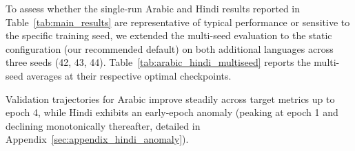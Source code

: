 \documentclass[11pt]{article}
\begin{document}
To assess whether the single-run Arabic and Hindi results reported in Table~\ref{tab:main_results} are representative of typical performance or sensitive to the specific training seed, we extended the multi-seed evaluation to the static configuration (our recommended default) on both additional languages across three seeds (42, 43, 44). Table~\ref{tab:arabic_hindi_multiseed} reports the multi-seed averages at their respective optimal checkpoints.

Validation trajectories for Arabic improve steadily across target metrics up to epoch 4, while Hindi exhibits an early-epoch anomaly (peaking at epoch 1 and declining monotonically thereafter, detailed in Appendix~\ref{sec:appendix_hindi_anomaly}).

\begin{table}[ht]
\centering
\small
{}
\caption{Multi-seed validation of the static boundary-regularization configuration (M5) on Arabic and Hindi. Standard deviations are small relative to the gap between the two languages on every target-side row, indicating that the single-run headline numbers in Table~\ref{tab:main_results} are representative of typical performance rather than seed-sensitive outliers.}
\label{tab:arabic_hindi_multiseed}
\end{table}
\end{document}
